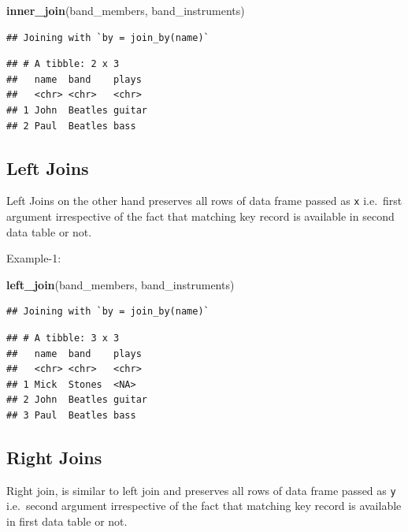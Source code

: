 \documentclass[
]{book}
\newenvironment{Shaded}{\begin{snugshade}}{\end{snugshade}}
\newcommand{\FunctionTok}[1]{\textcolor[rgb]{0.13,0.29,0.53}{\textbf{#1}}}
\newcommand{\NormalTok}[1]{#1}
\begin{document}
\begin{Shaded}
\begin{Highlighting}[]
\FunctionTok{inner\_join}\NormalTok{(band\_members, band\_instruments)}
\end{Highlighting}
\end{Shaded}

\begin{verbatim}
## Joining with `by = join_by(name)`
\end{verbatim}

\begin{verbatim}
## # A tibble: 2 x 3
##   name  band    plays 
##   <chr> <chr>   <chr> 
## 1 John  Beatles guitar
## 2 Paul  Beatles bass
\end{verbatim}

\hypertarget{left-joins}{%
\subsection{Left Joins}\label{left-joins}}

Left Joins on the other hand preserves all rows of data frame passed as \texttt{x} i.e.~first argument irrespective of the fact that matching key record is available in second data table or not.

Example-1:

\begin{Shaded}
\begin{Highlighting}[]
\FunctionTok{left\_join}\NormalTok{(band\_members, band\_instruments)}
\end{Highlighting}
\end{Shaded}

\begin{verbatim}
## Joining with `by = join_by(name)`
\end{verbatim}

\begin{verbatim}
## # A tibble: 3 x 3
##   name  band    plays 
##   <chr> <chr>   <chr> 
## 1 Mick  Stones  <NA>  
## 2 John  Beatles guitar
## 3 Paul  Beatles bass
\end{verbatim}

\hypertarget{right-joins}{%
\subsection{Right Joins}\label{right-joins}}

Right join, is similar to left join and preserves all rows of data frame passed as \texttt{y} i.e.~second argument irrespective of the fact that matching key record is available in first data table or not.
\end{document}
